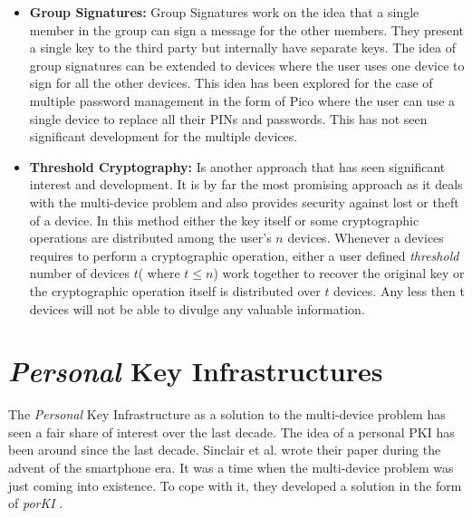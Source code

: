 \begin{itemize}
	\item \textbf{Group Signatures:} Group Signatures work on the idea that a single member in the group can sign a message for the other 						members. They present a single key to the third party but internally have separate keys\cite{Bellare2003}. The idea of group signatures can be 			extended to devices where the user uses one device to sign for all the other devices. This idea has been explored for the case of multiple 					password management in the form of Pico\cite{Stajano2011} where the user can use a single device to replace all their PINs and passwords. 				This has not seen significant development for the multiple devices. \\

	\item \textbf{Threshold Cryptography:} Is another approach that has seen significant interest and development. It is by far the most promising 			approach as it deals with the multi-device problem and also provides security against lost or theft of a device\cite{Desmedt2001}. In this 					method either the key itself or some cryptographic operations are distributed among the user's $n$ devices\cite{Desmedt1994}. Whenever a 			devices requires to perform a cryptographic operation, either a user defined \emph{threshold} number of devices $t$( where $t \leqslant n$) 			work together to recover the original key or the cryptographic operation itself is distributed over $t$ devices. Any less then t devices will not 			be able to divulge any valuable information.

\end{itemize}



\section{\emph{Personal} Key Infrastructures}

The \textit{Personal} Key Infrastructure as a solution to the multi-device problem has seen a fair share of interest over the last decade. The idea of a personal PKI has been around since the last decade. Sinclair et al. wrote their paper during the advent of the smartphone era. It was a time when the multi-device problem was just coming into existence. To cope with it, they developed a solution in the form of \textit{porKI} \cite{Sinclair2005}.

